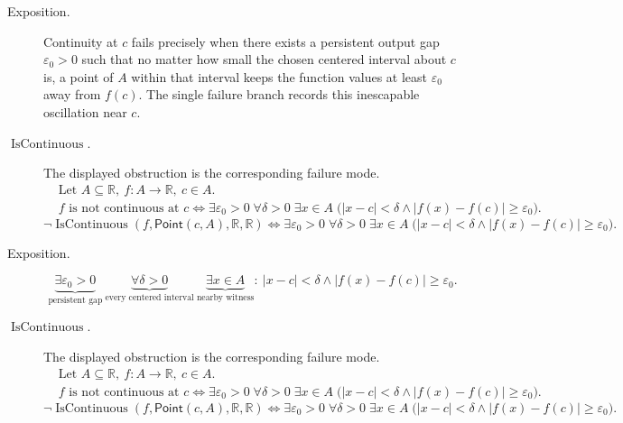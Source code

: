 \begin{remark*}
\begin{description}
  \item[Exposition.]
Continuity at $c$ fails precisely when there exists a persistent output gap $\varepsilon_0>0$ such that no matter how small the chosen centered interval about $c$ is, a point of $A$ within that interval keeps the function values at least $\varepsilon_0$ away from $f(c)$. The single failure branch records this inescapable oscillation near $c$.


  \item[\(\operatorname{IsContinuous}.\)]
  The displayed obstruction is the corresponding failure mode.
  \[
\begin{aligned}
&\text{Let } A \subseteq \mathbb{R},\ f:A\to\mathbb{R},\ c\in A.\\
&f \text{ is not continuous at } c
\Longleftrightarrow
\exists \varepsilon_0>0\;\forall \delta>0\;\exists x\in A\;
\bigl(|x-c|<\delta \land |f(x)-f(c)| \ge \varepsilon_0\bigr).
\end{aligned}
  \]
  \[
\neg\operatorname{IsContinuous}(f,\mathsf{Point}(c,A),\mathbb R,\mathbb R)
\Longleftrightarrow
\exists \varepsilon_0>0\;\forall \delta>0\;\exists x\in A\;
\bigl(|x-c|<\delta \land |f(x)-f(c)| \ge \varepsilon_0\bigr).
  \]
\end{description}
\end{remark*}

\begin{remark*}
\begin{description}
  \item[Exposition.]
\[
\underbrace{\exists \varepsilon_0>0}_{\text{persistent gap}}
\ \underbrace{\forall \delta>0}_{\text{every centered interval}}
\ \underbrace{\exists x\in A}_{\text{nearby witness}}
:\
|x-c|<\delta \land |f(x)-f(c)| \ge \varepsilon_0.
\]


  \item[\(\operatorname{IsContinuous}.\)]
  The displayed obstruction is the corresponding failure mode.
  \[
\begin{aligned}
&\text{Let } A \subseteq \mathbb{R},\ f:A\to\mathbb{R},\ c\in A.\\
&f \text{ is not continuous at } c
\Longleftrightarrow
\exists \varepsilon_0>0\;\forall \delta>0\;\exists x\in A\;
\bigl(|x-c|<\delta \land |f(x)-f(c)| \ge \varepsilon_0\bigr).
\end{aligned}
  \]
  \[
\neg\operatorname{IsContinuous}(f,\mathsf{Point}(c,A),\mathbb R,\mathbb R)
\Longleftrightarrow
\exists \varepsilon_0>0\;\forall \delta>0\;\exists x\in A\;
\bigl(|x-c|<\delta \land |f(x)-f(c)| \ge \varepsilon_0\bigr).
  \]
\end{description}
\end{remark*}

